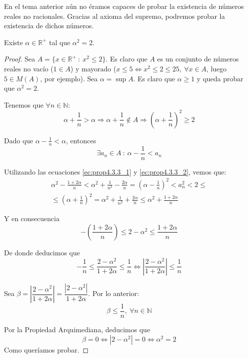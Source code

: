 En el tema anterior aún no éramos capaces de probar la existencia de números reales no racionales. Gracias al axioma del supremo, podremos probar la existencia de dichos números.
\begin{prop}
    Existe $\alpha \in \mathbb{R}^{+}$ tal que $\alpha^2 = 2$.
\end{prop}
\begin{proof}
    Sea $A = \{x \in \mathbb{R}^{+} ~:~ x^2 \leq 2\}$. Es claro que $A$ es un conjunto de números reales no vacío ($1 \in A$)
    y mayorado ($x \leq 5 \Leftrightarrow x^2 \leq 2 \leq 25,~\forall x \in A$, luego $5 \in M(A)$, por ejemplo). Sea $\alpha = \sup A$.
    Es claro que $\alpha \geq 1$ y queda probar que $\alpha^2 = 2$.
    
    Tenemos que $\forall n \in \mathbb{N}$:
    \begin{equation}\label{ec:prop4.3.3_1}
        \alpha + \frac{1}{n} > \alpha \Longrightarrow \alpha + \frac{1}{n} \notin A \Longrightarrow \left(\alpha + \frac{1}{n}\right)^2 \geq 2
    \end{equation}
    
    Dado que $\alpha - \frac{1}{n} < \alpha$, entonces
    \begin{equation}\label{ec:prop4.3.3_2}
        \exists a_n \in A ~:~ \alpha - \frac{1}{n} < a_n
    \end{equation}
    
    Utilizando las ecuaciones \ref{ec:prop4.3.3_1} y \ref{ec:prop4.3.3_2}, vemos que:
    \begin{multline*}
        \alpha^2 - \frac{1+2 \alpha}{n} < \alpha^2 + \frac{1}{n^2} - \frac{2 \alpha}{n} = \left(\alpha - \frac{1}{n}\right)^2 < a_n^2 < 2
        \leq \\ \leq
        \left(\alpha + \frac{1}{n}\right)^2 = \alpha^2 + \frac{1}{n^2} + \frac{2 \alpha}{n} \leq \alpha^2 + \frac{1+2 \alpha}{n}
    \end{multline*}
    
    Y en consecuencia
    \begin{equation*}
        -\left(\frac{1+2 \alpha}{n}\right) \leq 2 -\alpha^2 \leq \frac{1+2 \alpha}{n}
    \end{equation*}
    
    De donde deducimos que
    \begin{equation*}
        -\frac{1}{n} \leq \frac{2 - \alpha^2}{1+2 \alpha} \leq \frac{1}{n} \Longleftrightarrow \left| \frac{2 - \alpha^2}{1+2 \alpha} \right| \leq \frac{1}{n}
    \end{equation*}
    
    Sea $\beta = \left| \dfrac{2 - \alpha^2}{1+2 \alpha} \right| = \dfrac{|2 - \alpha^2|}{1+2 \alpha}$. Por lo anterior:
    \begin{equation*}
        \beta \leq \frac{1}{n}, ~\forall n \in \mathbb{N}
    \end{equation*}
    
    Por la Propiedad Arquimediana, deducimos que
    \begin{equation*}
        \beta = 0 \Longleftrightarrow |2 - \alpha^2| = 0 \Longleftrightarrow \alpha^2 = 2
    \end{equation*}
    Como queríamos probar.
\end{proof}

